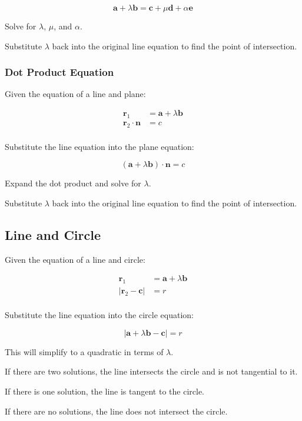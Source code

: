\documentclass[a4paper,11pt]{article}
\newcommand{\bb}{\boldsymbol}
\begin{document}
$$
\bb{a} + \lambda \bb{b}  = \bb{c} + \mu \bb{d} + \alpha \bb{e}
$$

Solve for $\lambda$, $\mu$, and $\alpha$.

Substitute $\lambda$ back into the original line equation to find the point of
intersection.


\subsubsection{Dot Product Equation}

Given the equation of a line and plane:

$$
\begin{aligned}
\bb{r}_1 & = \bb{a} + \lambda \bb{b} \\
\bb{r}_2 \cdot \bb{n} & = c \\
\end{aligned}
$$

Substitute the line equation into the plane equation:

$$
(\bb{a} + \lambda \bb{b}) \cdot \bb{n} = c
$$

Expand the dot product and solve for $\lambda$.

Substitute $\lambda$ back into the original line equation to find the point of
intersection.


\subsection{Line and Circle}

Given the equation of a line and circle:

$$
\begin{aligned}
\bb{r}_1 & = \bb{a} + \lambda \bb{b} \\
\lvert \bb{r}_2 - \bb{c} \rvert & = r \\
\end{aligned}
$$

Substitute the line equation into the circle equation:

$$
\lvert \bb{a} + \lambda \bb{b} - \bb{c} \rvert = r
$$

This will simplify to a quadratic in terms of $\lambda$.

If there are two solutions, the line intersects the circle and is not
tangential to it.

If there is one solution, the line is tangent to the circle.

If there are no solutions, the line does not intersect the circle.
\end{document}
